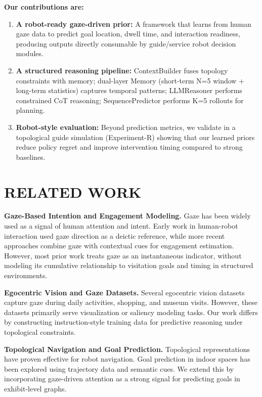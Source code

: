 \documentclass{article}
\begin{document}
\textbf{Our contributions are:}

\begin{enumerate}
    \item \textbf{A robot-ready gaze-driven prior:} A framework that learns from human gaze data to predict goal location, dwell time, and interaction readiness, producing outputs directly consumable by guide/service robot decision modules.
    \item \textbf{A structured reasoning pipeline:} ContextBuilder fuses topology constraints with memory; dual-layer Memory (short-term N=5 window + long-term statistics) captures temporal patterns; LLMReasoner performs constrained CoT reasoning; SequencePredictor performs K=5 rollouts for planning.
    \item \textbf{Robot-style evaluation:} Beyond prediction metrics, we validate in a topological guide simulation (Experiment-R) showing that our learned priors reduce policy regret and improve intervention timing compared to strong baselines.
\end{enumerate}

\section{RELATED WORK}

\textbf{Gaze-Based Intention and Engagement Modeling.} Gaze has been widely used as a signal of human attention and intent. Early work in human-robot interaction used gaze direction as a deictic reference, while more recent approaches combine gaze with contextual cues for engagement estimation. However, most prior work treats gaze as an instantaneous indicator, without modeling its cumulative relationship to visitation goals and timing in structured environments.

\textbf{Egocentric Vision and Gaze Datasets.} Several egocentric vision datasets capture gaze during daily activities, shopping, and museum visits. However, these datasets primarily serve visualization or saliency modeling tasks. Our work differs by constructing instruction-style training data for predictive reasoning under topological constraints.

\textbf{Topological Navigation and Goal Prediction.} Topological representations have proven effective for robot navigation. Goal prediction in indoor spaces has been explored using trajectory data and semantic cues. We extend this by incorporating gaze-driven attention as a strong signal for predicting goals in exhibit-level graphs.
\end{document}
